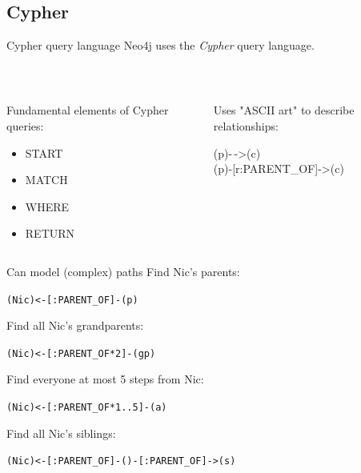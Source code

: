\documentclass{beamer}
\newcommand{\linespace}{\vskip 0.25cm}
\begin{document}
\subsection{Cypher}

\begin{frame}{Cypher query language}
			Neo4j uses the \emph{Cypher} query language.
			
			\linespace
			
			~\\
			
			\linespace

	\begin{columns}
		\begin{column}[T]{0.5\textwidth}
			
			Fundamental elements of Cypher queries:
		\begin{itemize}
			\item START
			\item MATCH
			\item WHERE
			\item RETURN
		\end{itemize}
		
	\end{column}
	\begin{column}[T]{0.5\textwidth}
		Uses "ASCII art" to describe relationships:
	
	\linespace
\begin{center}
	(p)-$\,$->(c) \\
	\linespace
	(p)-[r:PARENT\_OF]->(c)
\end{center}

	\end{column}	
	\end{columns}
\end{frame}

\begin{frame}{Can model (complex) paths}
	Find Nic's parents:
	
	\begin{center}
		\texttt{(Nic)<-[:PARENT\_OF]-(p)}
	\end{center}

	Find all Nic's grandparents:
	
	\begin{center}
		\texttt{(Nic)<-[:PARENT\_OF*2]-(gp)}
	\end{center}
	
		Find everyone at most 5 steps from Nic:
		
		\begin{center}
			\texttt{(Nic)<-[:PARENT\_OF*1..5]-(a)}
		\end{center}
		
	Find all Nic's siblings:
	
	\begin{center}
		\texttt{(Nic)<-[:PARENT\_OF]-()-[:PARENT\_OF]->(s)}
	\end{center}
	
\end{frame}
\end{document}
